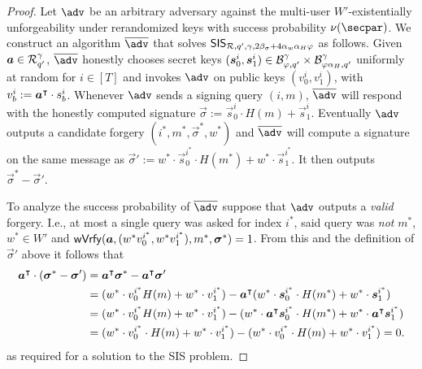 \begin{proof}
  Let $\adv$ be an arbitrary adversary against the multi-user $W'$-existentially unforgeability under rerandomized keys with success probability $\nu(\secpar)$.
  We construct an algorithm $\sisadvkots$ that solves $\mathsf{SIS}_{\mathcal{R},q',\gamma,2\beta_\sigma + 4\alpha_w\alpha_H\varphi}$ as follows.
  Given $\boldsymbol{a}\in\mathcal{R}_{q'}^\gamma$, $\sisadvkots$ honestly chooses secret keys $(\boldsymbol{s}^i_0,\boldsymbol{s}^i_1) \in \mathcal{B}_{\varphi, q'}^\gamma\times \mathcal{B}_{\varphi\alpha_H, q'}^\gamma$ uniformly at random for $i\in[T]$ and invokes $\adv$ on public keys $(v^i_0,v^i_1)$, with $v^i_b := \boldsymbol{a}^\intercal\cdot s^i_b$.
  Whenever $\adv$ sends a signing query $(i,m)$, $\sisadvkots$ will respond with the honestly computed signature $\vec{\sigma}:=\vec{s}^i_0\cdot H(m)+ \vec{s}^i_1$.
  Eventually $\adv$ outputs a candidate forgery $(i^*,m^*,\vec{\sigma}^*,w^*)$ and $\sisadvkots$ will compute a signature on the same message as $\vec{\sigma}' := w^*\cdot\vec{s}^{i^*}_0\cdot H(m^*)+ w^*\cdot\vec{s}^{i^*}_1$.
  It then outputs $\vec{\sigma}^*-\vec{\sigma}'$.
  
  To analyze the success probability of $\sisadvkots$ suppose that $\adv$ outputs a \emph{valid} forgery.
  I.e., at most a single query was asked for index $i^*$, said query was \emph{not} $m^*$, $w^*\in W'$ and $\mathsf{wVrfy}(\boldsymbol{a},(w^*v^{i^*}_0,w^*v^{i^*}_1),m^*,\allowbreak\boldsymbol{\sigma}^*)=1$.
  From this and the definition of $\vec{\sigma}'$ above it follows that
  \begin{align*}
       \boldsymbol{a}^\intercal\cdot(\boldsymbol{\sigma}^*-\boldsymbol{\sigma}') ={}& \boldsymbol{a}^\intercal\boldsymbol{\sigma}^*-\boldsymbol{a}^\intercal\boldsymbol{\sigma}'\\ 
    ={}& (w^*\cdot v^{i^*}_0 H(m) + w^*\cdot v^{i^*}_1) - \boldsymbol{a}^\intercal(w^*\cdot \boldsymbol{s}^{i^*}_0\cdot H(m^*)+ w^*\cdot\boldsymbol{s}^{i^*}_1)\\
    ={}& (w^*\cdot v^{i^*}_0 H(m) + w^*\cdot v^{i^*}_1) - (w^*\cdot\boldsymbol{a}^\intercal\boldsymbol{s}^{i^*}_0\cdot H(m^*)+ w^*\cdot\boldsymbol{a}^\intercal\boldsymbol{s}^{i^*}_1)\\
    ={}& (w^*\cdot v^{i^*}_0\cdot H(m) + w^*\cdot v^{i^*}_1) - (w^*\cdot v^{i^*}_0\cdot H(m) + w^*\cdot v^{i^*}_1) = 0.
  \end{align*}
  as required for a solution to the SIS problem.
  

\end{proof}
